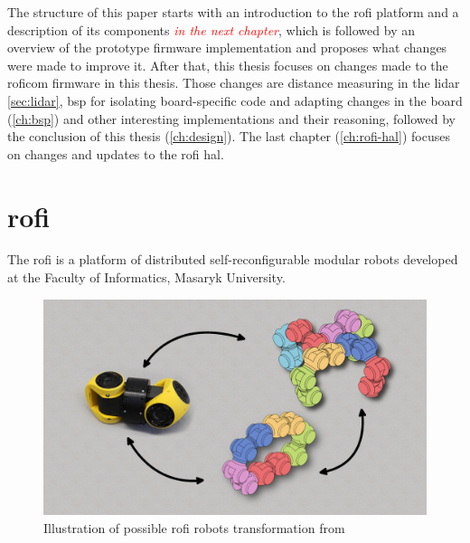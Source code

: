 \documentclass[
  digital,     %
  oneside,     %
  nosansbold,  %
  nocolorbold, %
  nolof,         %
  nolot,         %
]{fithesis4}
\newcommand{\TODO}[1]{\textcolor{red}{\textit{#1}}}
\newcommand{\TODOLIST}[1]{}
\begin{document}
The structure of this paper starts with an introduction to the \acrshort{rofi} platform and a description of its components \TODO{in the next chapter}, which is followed by an overview of the prototype firmware implementation and proposes what changes were made to improve it. After that, this thesis focuses on changes made to the \acrshort{roficom} firmware in this thesis. Those changes are distance measuring in the \acrshort{lidar} \autoref{sec:lidar}, \acrlong{bsp} for isolating board-specific code and adapting changes in the board (\autoref{ch:bsp}) and other interesting implementations and their reasoning, followed by the conclusion of this thesis (\autoref{ch:design}). The last chapter (\autoref{ch:rofi-hal}) focuses on changes and updates to the \acrshort{rofi} \acrlong{hal}.

\chapter[ RoFI ]{ \acrshort{rofi} }
\TODOLIST{
\begin{itemize}
    \item Describe the platform
    \item Universal module
\end{itemize}
}

The \acrshort{rofi} is a platform of distributed self-reconfigurable modular robots developed at the Faculty of Informatics, Masaryk University.

\begin{figure}
    \includegraphics[width=\textwidth,height=\textheight,keepaspectratio]{assets/rofiTransformation.jpg}
    \caption[\acrshort{rofi} transformation]{Illustration of possible \acrshort{rofi} robots transformation from \TODO{\cite{rofiweb}}}
    \label{fig:rofi-transformation}
\end{figure}
\end{document}

